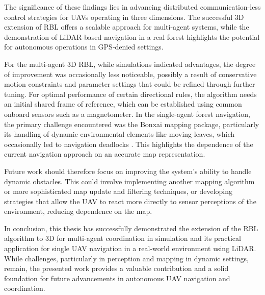 The significance of these findings lies in advancing distributed communication-less control strategies for \ac{UAV}s operating in three dimensions. 
The successful 3D extension of \ac{RBL} offers a scalable approach for multi-agent systems, while the demonstration of \ac{LiDAR}-based navigation in a real forest highlights the potential for autonomous operations in \ac{GPS}-denied settings. 

For the multi-agent 3D \ac{RBL}, while simulations indicated advantages, the degree of improvement was occasionally less noticeable, possibly a result of conservative motion constraints and parameter settings that could be refined through further tuning.
For optimal performance of certain directional rules, the algorithm needs an initial shared frame of reference, which can be established using common onboard sensors such as a magnetometer.
In the single-agent forest navigation, the primary challenge encountered was the Bonxai mapping package, particularly its handling of dynamic environmental elements like moving leaves, which occasionally led to navigation deadlocks \cite{flight_fail}. 
This highlights the dependence of the current navigation approach on an accurate map representation.

Future work should therefore focus on improving the system's ability to handle dynamic obstacles. 
This could involve implementing another mapping algorithm or more sophisticated map update and filtering techniques, or developing strategies that allow the \ac{UAV} to react more directly to sensor perceptions of the environment, reducing dependence on the map.

In conclusion, this thesis has successfully demonstrated the extension of the \ac{RBL} algorithm to 3D for multi-agent coordination in simulation and its practical application for single \ac{UAV} navigation in a real-world environment using \ac{LiDAR}. 
While challenges, particularly in perception and mapping in dynamic settings, remain, the presented work provides a valuable contribution and a solid foundation for future advancements in autonomous \ac{UAV} navigation and coordination.
